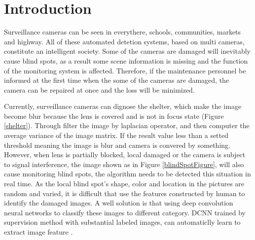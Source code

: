 \documentclass[sensors,article,submit,moreauthors,pdftex,10pt,a4paper]{mdpi}
\begin{document}


%
\section{Introduction}

Surveillance cameras can be seen in everythere, schools, communities, markets and highway. All of these automated detetion systems, based on multi cameras, constitute an intelligent society. Some of the cameras are damaged will inevitably cause blind spots, as a result some scene information is missing and the function of the monitoring system is affected. Therefore, if the maintenance personnel be informed at the first time when the some of the cameras are damaged, the camera can be repaired at once and the loss will be minimized.

Currently, surveillance cameras can dignose the shelter, which make the image become blur because the lens is covered and is not in focus state (Figure \ref{shelter}). Through filter the image by laplacian operator, and then computer the average variance of the image matrix. If the result value less than a setted threshold meaning the image is blur and camera is convered by something. However, when lens is partially blocked, local damaged or the camera is subject to signal interference, the image shown as in Figure \ref{blindSpotFigure}, will also cause monitoring blind spots, the algorithm needs to be detected this situation in real time. As the local blind spot's shape, color and location in the pictures are random and varied, it is difficult that use the features constructed by human to identify the damaged images. A well solution is that using deep convolution neural networks to classify these images to different category. DCNN trained by supervision method with substantial labeled images, can automaticlly learn to extract image feature \cite{zeiler2014visualizing}. 
\end{document}
